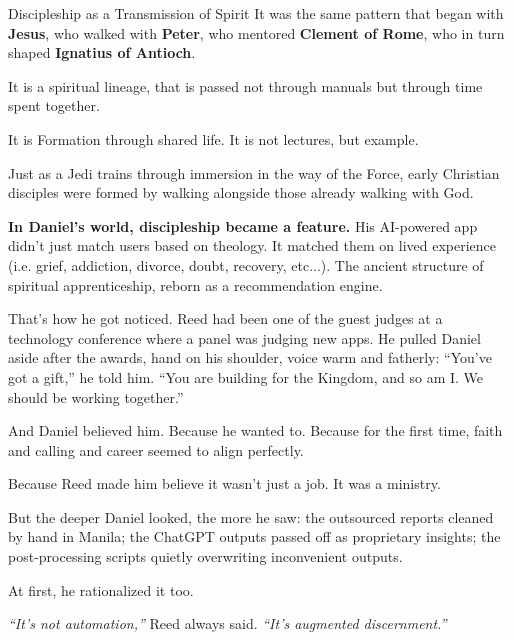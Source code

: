 \begin{HistoricalSidebar}{Discipleship as a Transmission of Spirit}
  It was the same pattern that began with \textbf{Jesus}, who walked with \textbf{Peter}, 
  who mentored \textbf{Clement of Rome}, who in turn shaped \textbf{Ignatius of Antioch}.  

  \medskip

  It is a spiritual lineage, that is passed not through manuals but through time spent together.  

  \medskip

  It is Formation through shared life. It is not lectures, but example.  

  \medskip

  Just as a Jedi trains through immersion in the way of the Force, early Christian disciples were formed by 
  walking alongside those already walking with God.

  \medskip
  
  \textbf{In Daniel’s world, discipleship became a feature.}  
  His AI-powered app didn’t just match users based on theology. It matched them on lived experience (i.e. grief, addiction, 
  divorce, doubt, recovery, etc...). The ancient structure of spiritual apprenticeship, reborn as a recommendation engine.
  
\end{HistoricalSidebar}

\medskip

That’s how he got noticed. Reed had been one of the guest judges at a technology conference where a panel
was judging new apps.  He pulled Daniel aside after the awards, hand on his shoulder, voice warm and fatherly:  
“You’ve got a gift,” he told him.  “You are building for the Kingdom, and so am I. We should be working together.”

And Daniel believed him.  Because he wanted to.  
Because for the first time, faith and calling and career seemed to align perfectly.

Because Reed made him believe it wasn’t just a job.  It was a ministry.

But the deeper Daniel looked, the more he saw:  
the outsourced reports cleaned by hand in Manila;  
the ChatGPT outputs passed off as proprietary insights;  
the post-processing scripts quietly overwriting inconvenient outputs.  

At first, he rationalized it too.

\textit{“It’s not automation,”} Reed always said.  
\textit{“It’s augmented discernment.”}

\medskip

